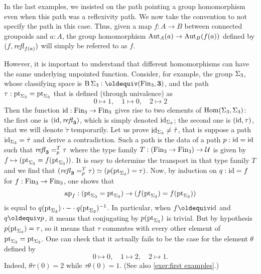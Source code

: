 \begin{remark}
  In the last examples, we insisted on the path pointing a group
  homomorphism even when this path was a reflexivity path. We now take
  the convention to not specify the path in this case. Thus, given a
  map $f:A \to B$ between connected groupoids and $a:A$, the group
  homomorphism $\operatorname{Aut}_A(a) \to \operatorname{Aut}_B(f(a))$ defined by
  $(f,\mathop{\mathit{refl}_{f(a)}})$ will simply be referred to as $f$.

  However, it is important to understand that different homomorphisms
  can have the same underlying unpointed function. Consider, for
  example, the group $\Sigma_{{3}}$, whose classifying space is
  $\clf \permgrp 3\defequi (\fin_3,\bn 3)$, and the path
  $\tau:\mathrm{pt}_{\Sigma_{{3}}}=\mathrm{pt}_{\Sigma_{{3}}}$ that is defined (through
  univalence) as
  \begin{displaymath}
    0\mapsto 1,\quad 1\mapsto 0,\quad 2 \mapsto 2 
  \end{displaymath}
  Then the function $\mathord{\mathrm{id}}: \operatorname{Fin}_3 \to \operatorname{Fin}_3$ gives rise to two
  elements of $\mathrm{Hom}(\Sigma_{{3}},\Sigma_{{3}})$: the first one is
  $(\mathord{\mathrm{id}},\mathop{\mathit{refl}_{\mathbf{3}}})$, which is simply denoted $\mathord{\mathrm{id}}_{\Sigma_{{3}}}$;
  the second one is $(\mathord{\mathrm{id}},\tau)$, that we will denote $\tilde\tau$
  temporarily. Let us prove $\mathord{\mathrm{id}}_{\Sigma_{{3}}} \neq \tilde \tau$, that
  is suppose a path $\mathord{\mathrm{id}}_{\Sigma_{{3}}}= \tilde \tau$ and derive a
  contradiction. Such a path is the data of a path $p:\mathord{\mathrm{id}} = \mathord{\mathrm{id}}$ such
  that $\mathop{\mathit{refl}_{\mathbf{3}}} =^{T}_{p} \tau$ where the type family
  $T:(\operatorname{Fin}_3\to\operatorname{Fin}_3) \to \mathcal{U}$ is given by
  $f\mapsto (\mathrm{pt}_{\Sigma_{{3}}} = f(\mathrm{pt}_{\Sigma_{{3}}}))$. It is easy to
  determine the transport in that type family $T$ and we find that
  $(\mathop{\mathit{refl}_{\mathbf{3}}} =^{T}_{p} \tau) \simeq (p(\mathrm{pt}_{\Sigma_{{3}}})=\tau)$. Now, by induction on $q:\mathord{\mathrm{id}}=f$ for
  $f:\operatorname{Fin}_3 \to \operatorname{Fin}_3$, one shows that
  \begin{displaymath}
    \mathop{\mathrm{ap}_{f}} : (\mathrm{pt}_{\Sigma_{{3}}} = \mathrm{pt}_{\Sigma_{{3}}}) \to
    (f(\mathrm{pt}_{\Sigma_{{3}}}) = f(\mathrm{pt}_{\Sigma_{{3}}}))
  \end{displaymath}
  is equal to
  $q(\mathrm{pt}_{\Sigma_{{3}}})\cdot {{-}}\cdot q(\mathrm{pt}_{\Sigma_{{3}}})^{-1}$. In particular, when $f\jdeq \id$ and $q\jdeq p$, it means
  that conjugating by $p(\mathrm{pt}_{\Sigma_{{3}}})$ is trivial. But by
  hypothesis $p(\mathrm{pt}_{\Sigma_{{3}}}) = \tau$, so it means that $\tau$
  commutes with every other element of
  $\mathrm{pt}_{\Sigma_{{3}}} = \mathrm{pt}_{\Sigma_{{3}}}$. One can check that it
  actually fails to be the case for the element $\theta$ defined by
  \begin{displaymath}
    0\mapsto 0,\quad 1\mapsto 2,\quad 2\mapsto 1 .
  \end{displaymath}
  Indeed, $\theta\tau(0) = 2$ while $\tau\theta(0) = 1$. (See also
  \cref{exer:first examples}.)
\end{remark}

